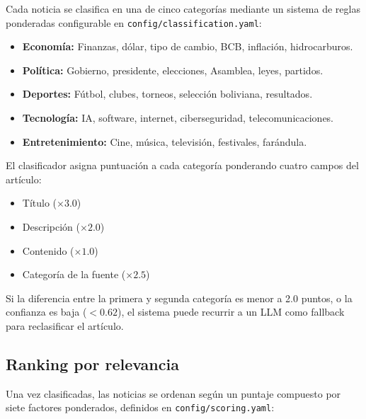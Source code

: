 \documentclass[12pt,oneside]{report}
\begin{document}
Cada noticia se clasifica en una de cinco categor\'ias mediante un sistema de reglas ponderadas configurable en \texttt{config/classification.yaml}:

\begin{itemize}[nosep]
    \item \textbf{Econom\'ia:} Finanzas, d\'olar, tipo de cambio, BCB, inflaci\'on, hidrocarburos.
    \item \textbf{Pol\'itica:} Gobierno, presidente, elecciones, Asamblea, leyes, partidos.
    \item \textbf{Deportes:} F\'utbol, clubes, torneos, selecci\'on boliviana, resultados.
    \item \textbf{Tecnolog\'ia:} IA, software, internet, ciberseguridad, telecomunicaciones.
    \item \textbf{Entretenimiento:} Cine, m\'usica, televisi\'on, festivales, far\'andula.
\end{itemize}

El clasificador asigna puntuaci\'on a cada categor\'ia ponderando cuatro campos del art\'iculo:
\begin{itemize}[nosep]
    \item T\'itulo ($\times 3.0$)
    \item Descripci\'on ($\times 2.0$)
    \item Contenido ($\times 1.0$)
    \item Categor\'ia de la fuente ($\times 2.5$)
\end{itemize}

Si la diferencia entre la primera y segunda categor\'ia es menor a 2.0 puntos, o la confianza es baja ($<0.62$), el sistema puede recurrir a un LLM como fallback para reclasificar el art\'iculo.

\subsection{Ranking por relevancia}

Una vez clasificadas, las noticias se ordenan seg\'un un puntaje compuesto por siete factores ponderados, definidos en \texttt{config/scoring.yaml}:
\end{document}
